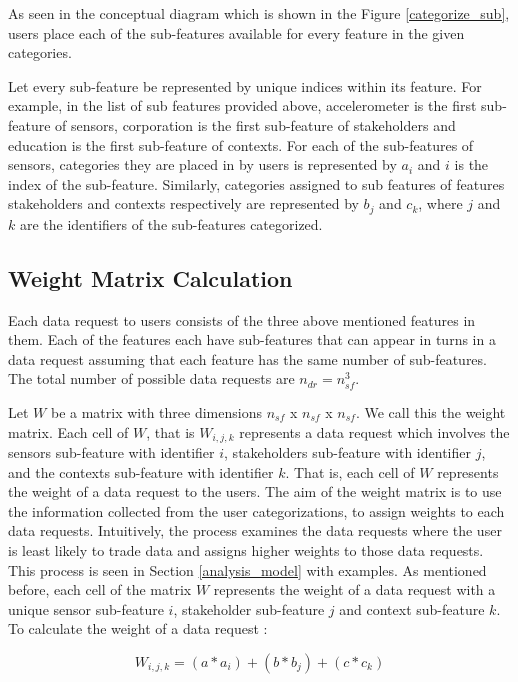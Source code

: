As seen in the conceptual diagram which is shown in the Figure \ref{categorize_sub}, users place each of the sub-features available for every feature in the given categories.

Let every sub-feature be represented by unique indices within its feature. For example, in the list of sub features provided above, accelerometer is the first sub-feature of sensors, corporation is the first sub-feature of stakeholders and education is the first sub-feature of contexts. For each of the sub-features of sensors, categories they are placed in by users is represented by $a_{i}$ and $i$ is the index
of the sub-feature. Similarly, categories assigned to sub features of features stakeholders and contexts respectively are represented by $b_{j}$ and $c_{k}$, where $j$ and $k$ are the identifiers of the sub-features categorized.

\subsection{Weight Matrix Calculation}
Each data request to users consists of the three above mentioned features in them. Each of the features each have \numsubfeatures sub-features that can appear in turns in a data request assuming that each feature has the same number of sub-features. The total number of possible data requests are $n_{dr} =  n_{sf}^3$.

Let $W$  be a matrix with three dimensions $n_{sf}$ x $n_{sf}$ x $n_{sf}$. We call this the weight matrix.
Each cell of $W$, that is $W_{i,j,k}$ represents a data request which involves the sensors sub-feature with identifier $i$, stakeholders sub-feature with identifier $j$,
and the contexts sub-feature with identifier $k$. That is, each cell of $W$ represents the weight of a data request to the users. The aim of the weight matrix is to use the information collected from the user categorizations, to assign weights to each data requests. Intuitively, the process examines the
data requests where the user is least likely to trade data and assigns higher weights to those data requests. This process is seen in
Section \ref{analysis_model} with examples. As mentioned before, each cell of the matrix $W$ represents the weight of a data request with a unique sensor sub-feature $i$, stakeholder sub-feature $j$ and context sub-feature $k$. To calculate the weight of a data request :

\begin{equation}
W_{i,j,k} = (a*a_{i}) + (b*b_{j}) + (c*c_{k})
\end{equation}

